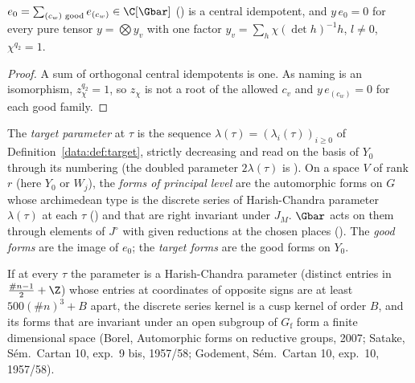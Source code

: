 \begin{lemma}
\label{ub-objects:lem:e0}
$e_0=\sum_{(c_w)\text{ good}}e_{(c_w)}\in\C[\Gbar]$ () is a central
idempotent, and $y\,e_0=0$ for every pure tensor $y=\bigotimes y_v$ with one factor
$y_v=\sum_h\chi(\det h)^{-1}h$, $l\ne0$, $\chi^{q_2}=1$.
\end{lemma}

\begin{proof}
A sum of orthogonal central idempotents is one. As naming is an isomorphism, $z_\chi^{q_2}=1$, so
$z_\chi$ is not a root of the allowed $c_v$ and $y\,e_{(c_w)}=0$ for each good family.
\end{proof}

\begin{definition}\label{ub-objects:def:target}
The \emph{target parameter} at $\tau$ is the sequence $\lambda(\tau)=(\lambda_i(\tau))_{i\ge0}$ of
Definition~\ref{data:def:target}, strictly decreasing and read on the
basis of $Y_0$ through its numbering (the doubled parameter $2\lambda(\tau)$ is ). On a space $V$ of
rank $r$ (here $Y_0$ or $W_j$), the \emph{forms of principal level} are the automorphic forms on $G$
whose archimedean type is the discrete series of Harish-Chandra parameter $\lambda(\tau)$ at each
$\tau$ () and that are right invariant under $J_M$. $\Gbar$ acts on them
through elements of $J^\circ$ with given reductions at the chosen places ().
The \emph{good forms} are the image of $e_0$; the \emph{target forms} are the good forms on $Y_0$.
\end{definition}

\begin{fact}\label{ub-objects:fact:cusp}
If at every $\tau$ the parameter is a Harish-Chandra parameter (distinct entries in
$\frac{\#n-1}2+\Z$) whose entries at coordinates of opposite signs are at least
$500(\#n)^3+B$ apart, the discrete series kernel is a cusp kernel of order $B$, and its forms that
are invariant under an open subgroup of $G_{\mathrm f}$ form a finite dimensional space (Borel, Automorphic
forms on reductive groups, 2007; Satake, S\'em.\ Cartan 10, exp.~9 bis, 1957/58; Godement, S\'em.\
Cartan 10, exp.~10, 1957/58).
\end{fact}

